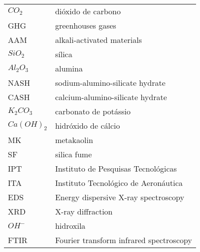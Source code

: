 \begin{longtable}{ll}
$CO_2$ & dióxido de carbono \\
GHG & greenhouses gases \\
AAM & alkali-activated materials \\
$ SiO_2$ & sílica \\
$ Al_2O_3$ & alumina \\
NASH & sodium-alumino-silicate hydrate \\
CASH & calcium-alumino-silicate hydrate \\
$K_2CO_3$ & carbonato de potássio \\
$Ca(OH)_2$ & hidróxido de cálcio \\
MK & metakaolin \\
SF & silica fume \\
IPT & Instituto de Pesquisas Tecnológicas \\
ITA & Instituto Tecnológico de Aeronáutica \\
EDS & Energy dispersive X-ray spectroscopy \\
XRD & X-ray diffraction \\
$OH^-$ & hidroxila \\
FTIR & Fourier transform infrared spectroscopy \\

\end{longtable}

